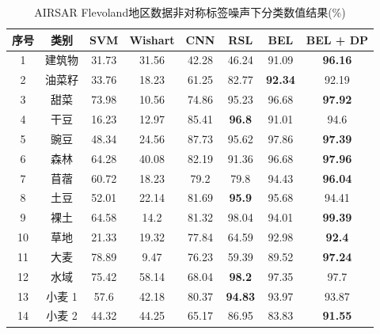 \begin{table}[ht!]
    \caption{AIRSAR Flevoland地区数据非对称标签噪声下分类数值结果(\%)}
    \label{tab:fle_res_random}
    \begin{tabular}{cccccccc}
        \toprule[1.5bp]
        序号                        & 类别    & SVM   & Wishart & CNN   & RSL            & BEL            & BEL + DP       \\
        \midrule[0.75bp]
        1                         & 建筑物   & 31.73 & 31.56   & 42.28 & 46.24          & 91.09          & \textbf{96.16} \\
        2                         & 油菜籽   & 33.76 & 18.23   & 61.25 & 82.77          & \textbf{92.34} & 92.19          \\
        3                         & 甜菜    & 73.98 & 10.56   & 74.86 & 95.23          & 96.68          & \textbf{97.92} \\
        4                         & 干豆    & 16.23 & 12.97   & 85.41 & \textbf{96.8}  & 91.01          & 94.6           \\
        5                         & 豌豆    & 48.34 & 24.56   & 87.73 & 95.62          & 97.86          & \textbf{97.39} \\
        6                         & 森林    & 64.28 & 40.08   & 82.19 & 91.36          & 96.68          & \textbf{97.96} \\
        7                         & 苜蓿    & 60.72 & 18.23   & 79.2  & 79.8           & 94.43          & \textbf{96.04} \\
        8                         & 土豆    & 52.01 & 22.14   & 81.69 & \textbf{95.9}  & 95.68          & 94.41          \\
        9                         & 裸土    & 64.58 & 14.2    & 81.32 & 98.04          & 94.01          & \textbf{99.39} \\
        10                        & 草地    & 21.33 & 19.32   & 77.84 & 64.59          & 92.98          & \textbf{92.4}  \\
        11                        & 大麦    & 78.89 & 9.47    & 76.23 & 59.39          & 89.52          & \textbf{97.24} \\
        12                        & 水域    & 75.42 & 58.14   & 68.04 & \textbf{98.2}  & 97.35          & 97.7           \\
        13                        & 小麦 1  & 57.6  & 42.18   & 80.37 & \textbf{94.83} & 93.97          & 93.87          \\
        14                        & 小麦 2  & 44.32 & 44.25   & 65.17 & 86.95          & 83.83          & \textbf{91.55} \\

\end{tabular}
\end{table}
